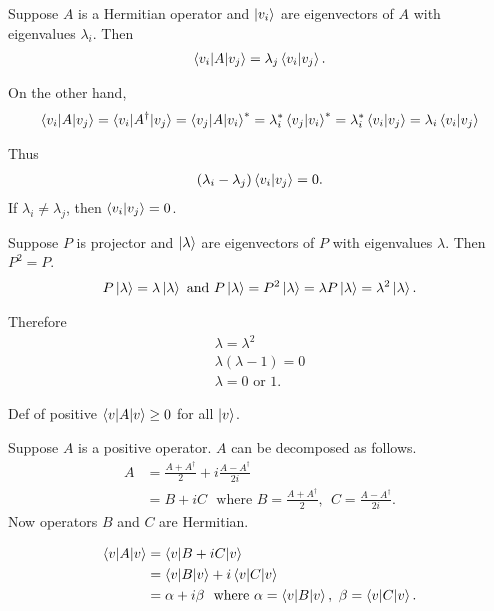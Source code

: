 
Suppose $A$ is a Hermitian operator and $\ket{v_i}$ are eigenvectors of $A$ with eigenvalues $\lambda_i$.
Then
\begin{align*}
	\braket{v_i | A | v_j} = \lambda_j \braket{v_i | v_j}.
\end{align*}

On the other hand,
\begin{align*}
	\braket{v_i | A | v_j} = \braket{v_i | A^\dagger | v_j}
	= \braket{v_j | A | v_i}^*
	= \lambda_i^* \braket{v_j | v_i}^*
	=  \lambda_i^* \braket{v_i | v_j}
	=  \lambda_i \braket{v_i | v_j}
\end{align*}

Thus
\begin{align*}
	(\lambda_i - \lambda_j) \braket{v_i | v_j}  = 0.
\end{align*}
If $\lambda_i \neq \lambda_j$, then $\braket{v_i | v_j}  = 0$.



Suppose $P$ is projector and $\ket{\lambda}$  are eigenvectors of $P$ with eigenvalues $\lambda$.
Then $P^2 = P$.
\begin{align*}
	P \ket{\lambda} = \lambda \ket{\lambda} \text{ and }	P \ket{\lambda} = P^2 \ket{\lambda} = \lambda  P \ket{\lambda} = \lambda^2 \ket{\lambda}.
\end{align*}

Therefore
\begin{align*}
	\lambda = \lambda^2\\
	\lambda (\lambda - 1) = 0\\
	\lambda = 0 \text{ or } 1.
\end{align*}



Def of positive $\braket{v | A | v} \geq 0$ for all $\ket{v}$.

Suppose $A$ is a positive operator. $A$ can be decomposed as follows.
\begin{align*}
	A &= \frac{A + A^\dagger}{2} + i \frac{A - A^\dagger}{2i}\\
		&= B + i C  ~~~\text{where } B =\frac{A + A^\dagger}{2}, ~~  C = \frac{A - A^\dagger}{2i}.
\end{align*}
Now operators $B$ and $C$ are Hermitian.

\begin{align*}
	\braket{v | A | v}  &= \braket{v | B + iC | v}\\
		&= \braket{v | B | v}  + i \braket{v | C | v}\\
		&= \alpha + i \beta ~~ \text{where } \alpha = \braket{v | B | v}, ~\beta = \braket{v | C | v}.
\end{align*}

